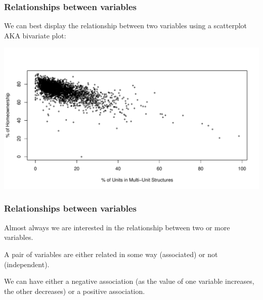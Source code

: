 \documentclass[handout]{beamer}
\newcommand{\blue}[1]{\textcolor{blue2}{#1}}
\begin{document}
\begin{frame}[fragile]
\frametitle{Relationships between variables}
We can best display the relationship between two variables using a \blue{scatterplot AKA bivariate plot}:

\begin{center}
\pause\includegraphics[width=\linewidth]{figure/relationships} 
\end{center}

\end{frame}


\begin{frame}
\frametitle{Relationships between variables}
Almost always we are interested in the relationship between two or more variables.

\vspace{0.25cm}

\pause A pair of variables are either related in some way (\blue{associated}) or not (\blue{independent}).

\vspace{0.25cm}

\pause We can have either a \blue{negative association} (as the value of one variable increases, the other decreases) or a \blue{positive association}.

\end{frame}
\end{document}
